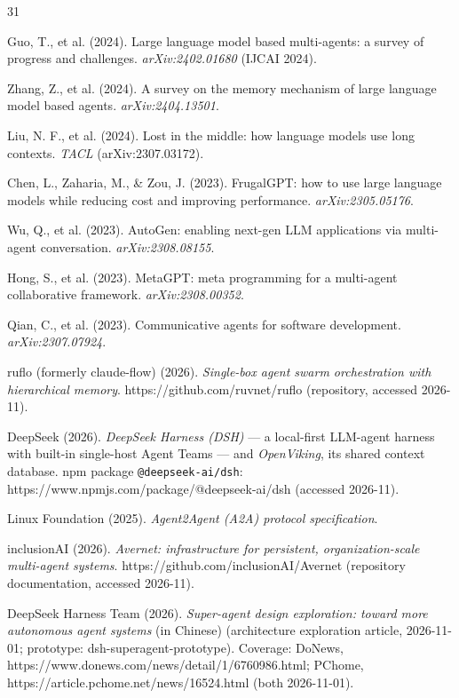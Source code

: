 \documentclass[journal]{IEEEtran}
\begin{document}
\begin{thebibliography}{31}

Guo, T., et al. (2024). Large language model based multi-agents: a survey of progress and challenges. \emph{arXiv:2402.01680} (IJCAI 2024).

Zhang, Z., et al. (2024). A survey on the memory mechanism of large language model based agents. \emph{arXiv:2404.13501}.

Liu, N. F., et al. (2024). Lost in the middle: how language models use long contexts. \emph{TACL} (arXiv:2307.03172).

Chen, L., Zaharia, M., \& Zou, J. (2023). FrugalGPT: how to use large language models while reducing cost and improving performance. \emph{arXiv:2305.05176}.

Wu, Q., et al. (2023). AutoGen: enabling next-gen LLM applications via multi-agent conversation. \emph{arXiv:2308.08155}.

Hong, S., et al. (2023). MetaGPT: meta programming for a multi-agent collaborative framework. \emph{arXiv:2308.00352}.

Qian, C., et al. (2023). Communicative agents for software development. \emph{arXiv:2307.07924}.

ruflo (formerly claude-flow) (2026). \emph{Single-box agent swarm orchestration with hierarchical memory}. https://github.com/ruvnet/ruflo (repository, accessed 2026-11).

DeepSeek (2026). \emph{DeepSeek Harness (DSH)} --- a local-first LLM-agent harness with built-in single-host Agent Teams --- and \emph{OpenViking}, its shared context database. npm package \texttt{@deepseek-ai/dsh}: https://www.npmjs.com/package/@deepseek-ai/dsh (accessed 2026-11).

Linux Foundation (2025). \emph{Agent2Agent (A2A) protocol specification}.

inclusionAI (2026). \emph{Avernet: infrastructure for persistent, organization-scale multi-agent systems}. https://github.com/inclusionAI/Avernet (repository documentation, accessed 2026-11).

DeepSeek Harness Team (2026). \emph{Super-agent design exploration: toward more autonomous agent systems} (in Chinese) (architecture exploration article, 2026-11-01; prototype: dsh-superagent-prototype). Coverage: DoNews, https://www.donews.com/news/detail/1/6760986.html; PChome, https://article.pchome.net/news/16524.html (both 2026-11-01).


\end{thebibliography}
\end{document}
